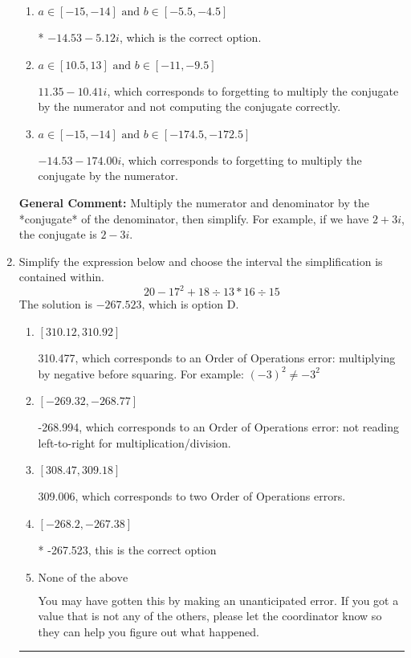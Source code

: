 \documentclass{extbook}[14pt]
\newcommand{\litem}[1]{\item #1

\rule{\textwidth}{0.4pt}}
\begin{document}
\begin{enumerate}
{\begin{enumerate}[label=\Alph*.]
 $-494.00  - 5.12 i$, which corresponds to forgetting to multiply the conjugate by the numerator and using a plus instead of a minus in the denominator.
\item \( a \in [-15, -14] \text{ and } b \in [-5.5, -4.5] \)

* $-14.53  - 5.12 i$, which is the correct option.
\item \( a \in [10.5, 13] \text{ and } b \in [-11, -9.5] \)

 $11.35  - 10.41 i$, which corresponds to forgetting to multiply the conjugate by the numerator and not computing the conjugate correctly.
\item \( a \in [-15, -14] \text{ and } b \in [-174.5, -172.5] \)

 $-14.53  - 174.00 i$, which corresponds to forgetting to multiply the conjugate by the numerator.
\end{enumerate}

\textbf{General Comment:} Multiply the numerator and denominator by the *conjugate* of the denominator, then simplify. For example, if we have $2+3i$, the conjugate is $2-3i$.
}
\litem{
Simplify the expression below and choose the interval the simplification is contained within.
\[ 20 - 17^2 + 18 \div 13 * 16 \div 15 \]The solution is \( -267.523 \), which is option D.\begin{enumerate}[label=\Alph*.]
\item \( [310.12, 310.92] \)

 310.477, which corresponds to an Order of Operations error: multiplying by negative before squaring. For example: $(-3)^2 \neq -3^2$
\item \( [-269.32, -268.77] \)

 -268.994, which corresponds to an Order of Operations error: not reading left-to-right for multiplication/division.
\item \( [308.47, 309.18] \)

 309.006, which corresponds to two Order of Operations errors.
\item \( [-268.2, -267.38] \)

* -267.523, this is the correct option
\item \( \text{None of the above} \)

 You may have gotten this by making an unanticipated error. If you got a value that is not any of the others, please let the coordinator know so they can help you figure out what happened.
\end{enumerate}

}
\end{enumerate}
\end{document}
